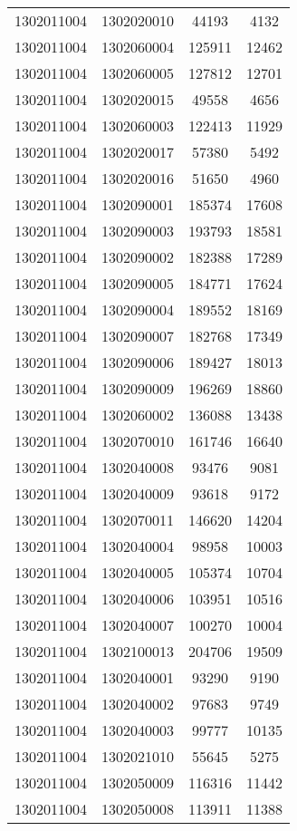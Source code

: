 \begin{longtable}[h]{llcc}
		1302011004 & 1302020010 & 44193 & 4132\\
		1302011004 & 1302060004 & 125911 & 12462\\
		1302011004 & 1302060005 & 127812 & 12701\\
		1302011004 & 1302020015 & 49558 & 4656\\
		1302011004 & 1302060003 & 122413 & 11929\\
		1302011004 & 1302020017 & 57380 & 5492\\
		1302011004 & 1302020016 & 51650 & 4960\\
		1302011004 & 1302090001 & 185374 & 17608\\
		1302011004 & 1302090003 & 193793 & 18581\\
		1302011004 & 1302090002 & 182388 & 17289\\
		1302011004 & 1302090005 & 184771 & 17624\\
		1302011004 & 1302090004 & 189552 & 18169\\
		1302011004 & 1302090007 & 182768 & 17349\\
		1302011004 & 1302090006 & 189427 & 18013\\
		1302011004 & 1302090009 & 196269 & 18860\\
		1302011004 & 1302060002 & 136088 & 13438\\
		1302011004 & 1302070010 & 161746 & 16640\\
		1302011004 & 1302040008 & 93476 & 9081\\
		1302011004 & 1302040009 & 93618 & 9172\\
		1302011004 & 1302070011 & 146620 & 14204\\
		1302011004 & 1302040004 & 98958 & 10003\\
		1302011004 & 1302040005 & 105374 & 10704\\
		1302011004 & 1302040006 & 103951 & 10516\\
		1302011004 & 1302040007 & 100270 & 10004\\
		1302011004 & 1302100013 & 204706 & 19509\\
		1302011004 & 1302040001 & 93290 & 9190\\
		1302011004 & 1302040002 & 97683 & 9749\\
		1302011004 & 1302040003 & 99777 & 10135\\
		1302011004 & 1302021010 & 55645 & 5275\\
		1302011004 & 1302050009 & 116316 & 11442\\
		1302011004 & 1302050008 & 113911 & 11388\\

\end{longtable}
